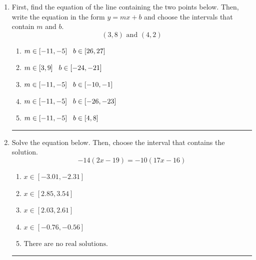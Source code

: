 \documentclass[14pt]{extbook}
\newcommand{\litem}[1]{\item#1\hspace*{-1cm}\rule{\textwidth}{0.4pt}}
\begin{document}
\begin{enumerate}
\litem{
First, find the equation of the line containing the two points below. Then, write the equation in the form $ y=mx+b $ and choose the intervals that contain $m$ and $b$.\[ (3, 8) \text{ and } (4, 2) \]\begin{enumerate}[label=\Alph*.]
\item \( m \in [-11, -5] \hspace*{3mm} b \in [26, 27] \)
\item \( m \in [3, 9] \hspace*{3mm} b \in [-24, -21] \)
\item \( m \in [-11, -5] \hspace*{3mm} b \in [-10, -1] \)
\item \( m \in [-11, -5] \hspace*{3mm} b \in [-26, -23] \)
\item \( m \in [-11, -5] \hspace*{3mm} b \in [4, 8] \)

\end{enumerate} }
\litem{
Solve the equation below. Then, choose the interval that contains the solution.\[ -14(2x -19) = -10(17x -16) \]\begin{enumerate}[label=\Alph*.]
\item \( x \in [-3.01, -2.31] \)
\item \( x \in [2.85, 3.54] \)
\item \( x \in [2.03, 2.61] \)
\item \( x \in [-0.76, -0.56] \)
\item \( \text{There are no real solutions.} \)


\end{enumerate}}
\end{enumerate}
\end{document}

